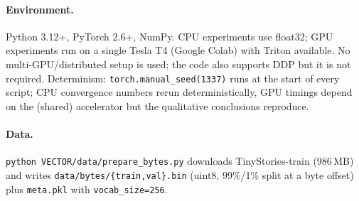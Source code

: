 \documentclass[11pt]{article}
\begin{document}
\paragraph{Environment.}
Python 3.12+, PyTorch 2.6+, NumPy. CPU experiments use float32; GPU experiments
run on a single Tesla T4 (Google Colab) with Triton available. No
multi-GPU/distributed setup is used; the code also supports DDP but it is not
required. Determinism: \texttt{torch.manual\_seed(1337)} runs at the start of
every script; CPU convergence numbers rerun deterministically, GPU timings
depend on the (shared) accelerator but the qualitative conclusions reproduce.

\paragraph{Data.}
\texttt{python VECTOR/data/prepare\_bytes.py} downloads TinyStories-train
(986\,MB) and writes \texttt{data/bytes/\{train,val\}.bin} (uint8,
99\%/1\% split at a byte offset) plus \texttt{meta.pkl} with
\texttt{vocab\_size=256}.
\end{document}
